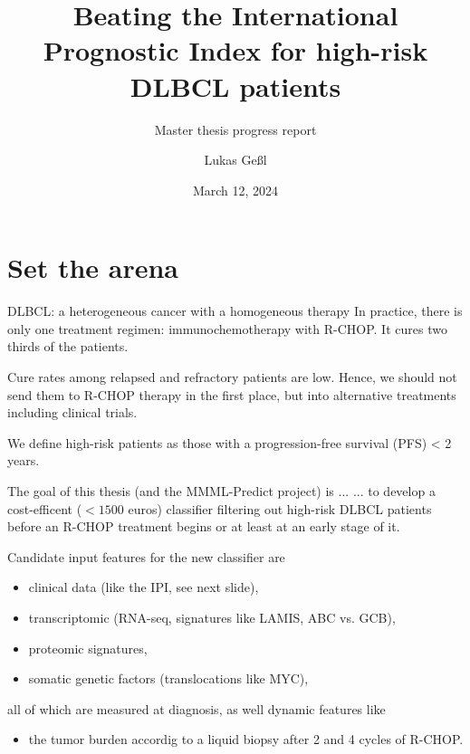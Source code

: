 \documentclass[10pt, aspectratio=169]{beamer}
\title{Beating the International Prognostic Index for high-risk DLBCL patients}
\subtitle{Master thesis progress report}
\date{March 12, 2024}
\author{Lukas Geßl}
\institute{Chair of Statistical Bioinformatics, Regensburg University}
\begin{document}
\maketitle

\section{Set the arena}

\begin{frame}{DLBCL: a heterogeneous cancer with a homogeneous therapy}
  In practice, there is only one treatment regimen: immunochemotherapy with R-CHOP. 
  It cures two thirds of the patients.

  Cure rates among relapsed and refractory patients are low. Hence, we should not send 
  them to R-CHOP therapy in the first place, but into alternative treatments including 
  clinical trials.
  
  \pause
  We define \alert{high-risk} patients as those with a 
  \alert{progression-free survival (PFS) < 2 years}.

  \medskip
  \begin{block}{The goal of this thesis (and the MMML-Predict project) is ...}
    ... to develop a \alert{cost-efficent ($< \num{1500}$ euros) classifier filtering out 
    high-risk DLBCL patients} before an R-CHOP treatment begins or at least at an early 
    stage of it.
  \end{block}
\end{frame}

\begin{frame}{}
  Candidate input features for the new classifier are 
  \begin{itemize}
    \item clinical data (like the IPI, see next slide),
    \item transcriptomic (RNA-seq, signatures like LAMIS, ABC vs. GCB),
    \item proteomic signatures,
    \item somatic genetic factors (translocations like MYC),
  \end{itemize}
  all of which are measured \alert{at diagnosis}, as well \alert{dynamic} features like 
  \begin{itemize}
    \item the tumor burden accordig to a liquid biopsy after 2 and 4 cycles of R-CHOP. 
  \end{itemize}

\end{frame}
\end{document}
